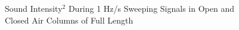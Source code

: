 \begin{figure}
	\hspace{40pt}
	\caption{Sound Intensity$^2$ During 1 Hz/s Sweeping Signals in Open and Closed Air Columns of Full Length\label{fig:test}}
\end{figure}
\clearpage

